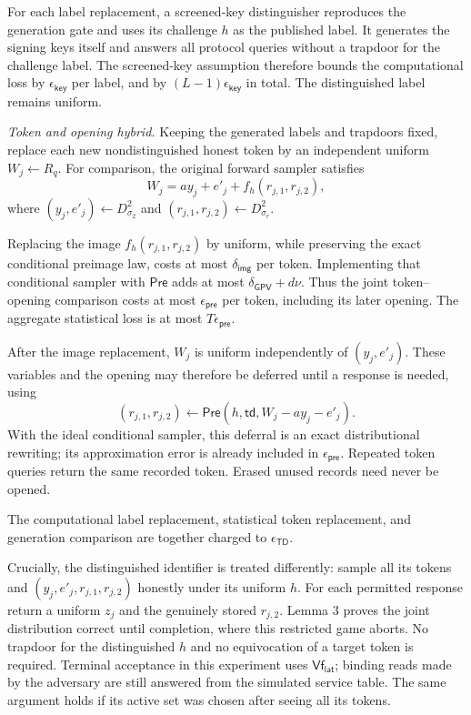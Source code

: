 \documentclass[lettersize,journal]{IEEEtran}
\begin{document}
For each label replacement, a screened-key distinguisher reproduces
the generation gate and uses its challenge $h$ as the published label.
It generates the signing keys itself and answers all protocol queries
without a trapdoor for the challenge label.
The screened-key assumption therefore bounds the computational loss
by $\epsilon_{\mathsf{key}}$ per label, and by
$(L-1)\epsilon_{\mathsf{key}}$ in total.
The distinguished label remains uniform.

\emph{Token and opening hybrid.}
Keeping the generated labels and trapdoors fixed, replace each new
nondistinguished honest token by an independent uniform
$W_j\leftarrow R_q$.
For comparison, the original forward sampler satisfies
\[
W_j=ay_j+e'_j+f_h(r_{j,1},r_{j,2}),
\]
where $(y_j,e'_j)\leftarrow D_{\sigma_2}^{2}$ and
$(r_{j,1},r_{j,2})\leftarrow D_{\sigma_r}^{2}$.

Replacing the image $f_h(r_{j,1},r_{j,2})$ by uniform,
while preserving the exact conditional preimage law,
costs at most $\delta_{\mathsf{img}}$ per token.
Implementing that conditional sampler with $\mathsf{Pre}$
adds at most $\delta_{\mathsf{GPV}}+d\nu$.
Thus the joint token--opening comparison costs at most
$\epsilon_{\mathsf{pre}}$ per token, including its later opening.
The aggregate statistical loss is at most
$T\epsilon_{\mathsf{pre}}$.

After the image replacement, $W_j$ is uniform independently of
$(y_j,e'_j)$.
These variables and the opening may therefore be deferred until
a response is needed, using
\[
(r_{j,1},r_{j,2})\leftarrow
\mathsf{Pre}(h,\mathsf{td},W_j-ay_j-e'_j).
\]
With the ideal conditional sampler, this deferral is an exact
distributional rewriting; its approximation error is already
included in $\epsilon_{\mathsf{pre}}$.
Repeated token queries return the same recorded token.
Erased unused records need never be opened.

The computational label replacement, statistical token replacement,
and generation comparison are together charged to
$\epsilon_{\mathsf{TD}}$.

Crucially, the distinguished identifier is treated differently: sample all
its tokens and $(y_j,e'_j,r_{j,1},r_{j,2})$ honestly under its uniform $h$.
For each permitted response return a uniform $z_j$ and the genuinely stored
$r_{j,2}$. Lemma 3 proves the joint distribution correct until completion,
where this restricted game aborts. No trapdoor for the distinguished $h$
and no equivocation of a target token is required. Terminal
acceptance in this experiment uses $\mathsf{Vf}_{\mathsf{lat}}$;
binding reads made by the adversary are still answered from the
simulated service table. The same argument holds
if its active set was chosen after seeing all its tokens.
\end{document}
